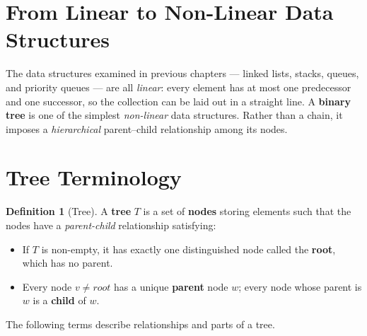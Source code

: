 \documentclass[11pt, a4paper, notitlepage]{report}
\theoremstyle{definition}
\newtheorem{definition}[theorem]{Definition}
\theoremstyle{remark}
\theoremstyle{definition}
\begin{document}
\section{From Linear to Non-Linear Data Structures}
\label{sec:bt-intro}

The data structures examined in previous chapters --- linked lists, stacks,
queues, and priority queues --- are all \emph{linear}: every element has at
most one predecessor and one successor, so the collection can be laid out in a
straight line.  A \textbf{binary tree} is one of the simplest
\emph{non-linear} data structures.  Rather than a chain, it imposes a
\emph{hierarchical} parent--child relationship among its nodes.

\section{Tree Terminology}
\label{sec:tree-terminology}

\begin{definition}[Tree]
\label{def:tree}
A \textbf{tree} $T$ is a set of \textbf{nodes} storing elements such that the
nodes have a \emph{parent-child} relationship satisfying:
\begin{itemize}
  \item If $T$ is non-empty, it has exactly one distinguished node called the
        \textbf{root}, which has no parent.
  \item Every node $v \neq \textit{root}$ has a unique \textbf{parent} node
        $w$; every node whose parent is $w$ is a \textbf{child} of $w$.
\end{itemize}
\end{definition}

The following terms describe relationships and parts of a tree.
\end{document}

